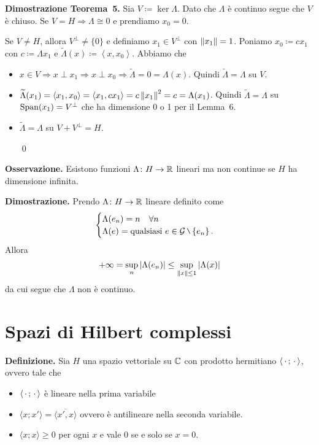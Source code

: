 \textbf{Dimostrazione Teorema~5.}
Sia $V \coloneqq \ker \Lambda$. Dato che $\Lambda$ è continuo segue che $V$ è chiuso.
Se $V = H \Longrightarrow \Lambda \cong 0$ e prendiamo $x_0 = 0$.

Se $V \neq H$, allora $V^\perp \neq \{0\}$ e definiamo $x_1 \in V^\perp$ con $\left\lVert x_1 \right\rVert = 1$.
Poniamo $x_0 \coloneqq  c x_1$ con $c \coloneqq  \Lambda x_1$ e $\tilde{\Lambda}(x) \coloneqq \left<x,x_0 \right>$. Abbiamo che
\begin{itemize}

	\item $x \in V \Longrightarrow x \perp x_1 \Longrightarrow x \perp x_0 \Longrightarrow \tilde{\Lambda} = 0 = \Lambda(x)$. Quindi $\tilde{\Lambda} = \Lambda$ su $V$.

	\item $\widetilde{\Lambda}(x_1) = \left<x_1,x_0 \right> = \left<x_1, c x_1 \right> = c \left\lVert x_1 \right\rVert^2 = c = \Lambda(x_1)$. Quindi $\tilde{\Lambda} = \Lambda$ su $\operatorname{Span}(x_1) = V^\perp$ che ha dimensione 0 o 1 per il Lemma~6.

	\item $\tilde{\Lambda} = \Lambda$ su $V + V^\perp = H$.

\qed
\end{itemize}

\textbf{Osservazione.}
Esistono funzioni $\Lambda \colon  H \to \mathbb R$ lineari ma non continue se $H$ ha dimensione infinita.

\textbf{Dimostrazione.} Prendo $\Lambda \colon H \to \mathbb R$ lineare definito come
%
$$
	\begin{cases}
	\Lambda(e_n) = n \quad \forall n \\
	\Lambda(e) = \text{qualsiasi } e \in \mc{G} \setminus \left\{ e_n \right\}.
	\end{cases} 
$$
%
Allora
%
$$
	+\infty = \sup_n \left| \Lambda(e_n) \right| \leq \sup_{\left\lVert x \right\rVert \leq 1} \left| \Lambda(x) \right| 
$$
%
da cui segue che $\Lambda$ non è continuo.


\section{Spazi di Hilbert complessi}

\textbf{Definizione.}
Sia $H$ una spazio vettoriale su $\mathbb C$ con prodotto hermitiano $\langle\,\cdot\,; \,\cdot\,\rangle$, ovvero tale che
\begin{itemize}
	\item $\langle \,\cdot\,; \,\cdot\, \rangle$ è lineare nella prima variabile
	\item $\langle x; x' \rangle = \overline{\langle x', x \rangle}$ ovvero è antilineare nella seconda variabile.
	\item $\langle x; x \rangle \geq 0$ per ogni $x$ e vale $0$ se e solo se $x = 0$.
\end{itemize}

